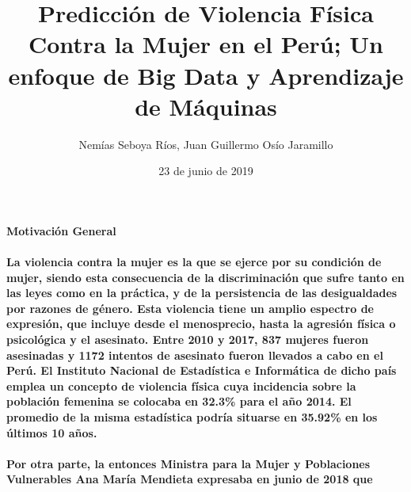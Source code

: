 \documentclass[]{article}
\title{Predicción de Violencia Física Contra la Mujer en el Perú; Un enfoque de
Big Data y Aprendizaje de Máquinas}
\author{Nemías Seboya Ríos, Juan Guillermo Osío Jaramillo}
\date{23 de junio de 2019}
\let\oldparagraph\paragraph
\renewcommand{\paragraph}[1]{\oldparagraph{#1}\mbox{}}
\begin{document}
\maketitle

\paragraph{\texorpdfstring{\textbf{Motivación
General}}{Motivación General}}\label{motivacion-general}

\paragraph{La violencia contra la mujer es la que se ejerce por su
condición de mujer, siendo esta consecuencia de la discriminación que
sufre tanto en las leyes como en la práctica, y de la persistencia de
las desigualdades por razones de género. Esta violencia tiene un amplio
espectro de expresión, que incluye desde el menosprecio, hasta la
agresión física o psicológica y el asesinato. Entre 2010 y 2017, 837
mujeres fueron asesinadas y 1172 intentos de asesinato fueron llevados a
cabo en el Perú. El Instituto Nacional de Estadística e Informática de
dicho país emplea un concepto de violencia física cuya incidencia sobre
la población femenina se colocaba en 32.3\% para el año 2014. El
promedio de la misma estadística podría situarse en 35.92\% en los
últimos 10
años.}\label{la-violencia-contra-la-mujer-es-la-que-se-ejerce-por-su-condicion-de-mujer-siendo-esta-consecuencia-de-la-discriminacion-que-sufre-tanto-en-las-leyes-como-en-la-practica-y-de-la-persistencia-de-las-desigualdades-por-razones-de-genero.-esta-violencia-tiene-un-amplio-espectro-de-expresion-que-incluye-desde-el-menosprecio-hasta-la-agresion-fisica-o-psicologica-y-el-asesinato.-entre-2010-y-2017-837-mujeres-fueron-asesinadas-y-1172-intentos-de-asesinato-fueron-llevados-a-cabo-en-el-peru.-el-instituto-nacional-de-estadistica-e-informatica-de-dicho-pais-emplea-un-concepto-de-violencia-fisica-cuya-incidencia-sobre-la-poblacion-femenina-se-colocaba-en-32.3-para-el-ano-2014.-el-promedio-de-la-misma-estadistica-podria-situarse-en-35.92-en-los-ultimos-10-anos.}

\paragraph{Por otra parte, la entonces Ministra para la Mujer y
Poblaciones Vulnerables Ana María Mendieta expresaba en junio de 2018
que}\label{por-otra-parte-la-entonces-ministra-para-la-mujer-y-poblaciones-vulnerables-ana-maria-mendieta-expresaba-en-junio-de-2018-que}
\end{document}
